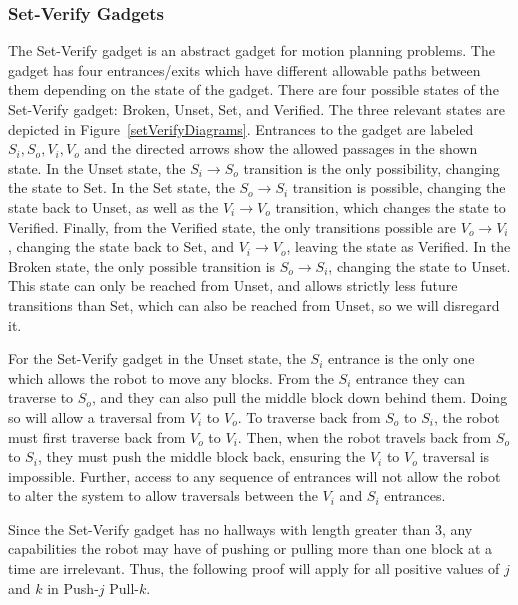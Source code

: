 \subsubsection{Set-Verify Gadgets}
\label{sec:SetVerifyGadgets}
The Set-Verify gadget is an abstract gadget for motion planning problems. The gadget has four entrances/exits which have different allowable paths between them depending on the state of the gadget. There are four possible states of the Set-Verify gadget: Broken, Unset, Set, and Verified. The three relevant states are depicted in Figure~\ref{setVerifyDiagrams}. Entrances to the gadget are labeled $S_i, S_o, V_i, V_o$ and the directed arrows show the allowed passages in the shown state. In the Unset state, the $S_i \rightarrow S_o$ transition is the only possibility, changing the state to Set. In the Set state, the $S_o \rightarrow S_i$ transition is possible, changing the state back to Unset, as well as the $V_i \rightarrow V_o$ transition, which changes the state to Verified. Finally, from the Verified state, the only transitions possible are $V_o \rightarrow V_i$, changing the state back to Set, and $V_i \rightarrow V_o$, leaving the state as Verified. In the Broken state, the only possible transition is $S_o \rightarrow S_i$, changing the state to Unset. This state can only be reached from Unset, and allows strictly less future transitions than Set, which can also be reached from Unset, so we will disregard it. 

For the Set-Verify gadget in the Unset state, the $S_i$ entrance is the only one which allows the robot to move any blocks. From the $S_i$ entrance they can traverse to $S_o$, and they can also pull the middle block down behind them. Doing so will allow a traversal from $V_i$ to $V_o$. To traverse back from $S_o$ to $S_i$, the robot must first traverse back from $V_o$ to $V_i$. Then, when the robot travels back from $S_o$ to $S_i$, they must push the middle block back, ensuring the $V_i$ to $V_o$ traversal is impossible. Further, access to any sequence of entrances will not allow the robot to alter the system to allow traversals between the $V_i$ and $S_i$ entrances. 

Since the Set-Verify gadget has no hallways with length greater than 3, any capabilities the robot may have of pushing or pulling more than one block at a time are irrelevant. Thus, the following proof will apply for all positive values of $j$ and $k$ in Push-$j$ Pull-$k$.

